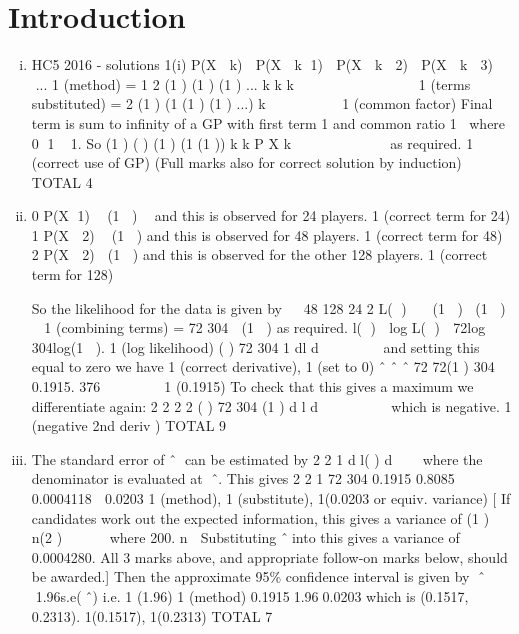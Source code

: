\documentclass{article}
\author{kobriendublin }
\date{December 2018}
\begin{document}
\section{Introduction}
\begin{enumerate}[(i)]
\item

HC5 2016 - solutions
1(i) P(X  k)  P(X  k 1)  P(X  k  2)  P(X  k  3) ... 1 (method)
= 1 2 (1 ) (1 ) (1 ) ... k k k               1 (terms substituted)
= 2 (1 ) (1 (1 ) (1 ) ...) k        1 (common factor)
Final term is sum to infinity of a GP with first term 1 and common ratio 1 where
0 1 1.
So
(1 )
( ) (1 )
(1 (1 ))
k
k P X k
 



   
 
as required. 1 (correct use of GP)
(Full marks also for correct solution by induction) TOTAL 4
\item 0 P(X 1)  (1 )  and this is observed for 24 players. 1 (correct term for 24)
1 P(X  2)  (1 ) and this is observed for 48 players. 1 (correct term for 48)
2 P(X  2)  (1 ) and this is observed for the other 128 players.
1 (correct term for 128)


So the likelihood for the data is given by
 
48 128 24 2 L( )   (1 ) (1 )  1 (combining terms)
= 72 304  (1 ) as required.
l( )  log L( )  72log  304log(1 ). 1 (log likelihood)
( ) 72 304
1
dl
d

  
 

and setting this equal to zero we have 1 (correct derivative), 1 (set to 0)
ˆ ˆ ˆ 72 72(1 ) 304 0.1915.
376
      1 (0.1915)
To check that this gives a maximum we differentiate again:
2
2 2 2
( ) 72 304
(1 )
d l
d

  
  

which is negative. 1 (negative 2nd deriv ) TOTAL 9
\item The standard error of ˆ
can be estimated by 2
2
1
d l( )
d



where the denominator is
evaluated at ˆ. This gives
2 2
1
72 304
0.1915 0.8085


0.0004118  0.0203
1 (method), 1 (substitute), 1(0.0203 or equiv. variance)
[ If candidates work out the expected information, this gives a variance of
(1 )
n(2 )
 



where
200. n  Substituting ˆinto this gives a variance of 0.0004280. All 3 marks above, and
appropriate follow-on marks below, should be awarded.]
Then the approximate 95\% confidence interval is given by ˆ 1.96s.e(ˆ) i.e. 1 (1.96)
1 (method)
0.19151.960.0203 which is (0.1517, 0.2313). 1(0.1517), 1(0.2313) TOTAL 7
\end{enumerate}
\end{document}
